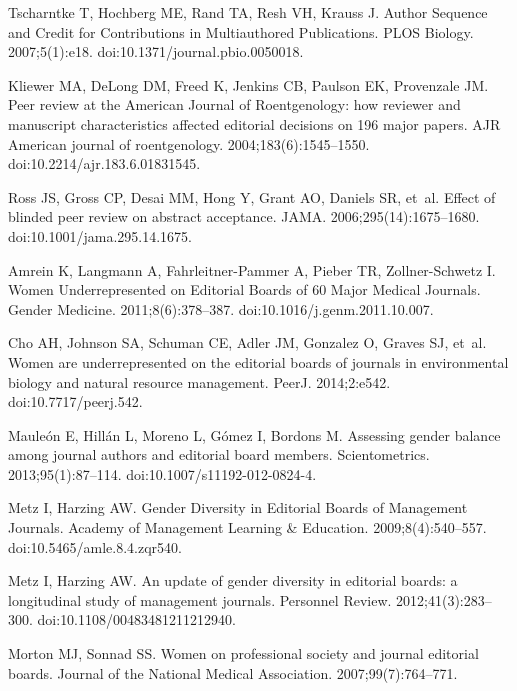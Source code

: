 \documentclass[10pt,letterpaper]{article}
\begin{document}
\begin{thebibliography}{100}
Tscharntke T, Hochberg ME, Rand TA, Resh VH, Krauss J.
\newblock Author {Sequence} and {Credit} for {Contributions} in {Multiauthored}
  {Publications}.
\newblock PLOS Biology. 2007;5(1):e18.
\newblock doi:{10.1371/journal.pbio.0050018}.

Kliewer MA, DeLong DM, Freed K, Jenkins CB, Paulson EK, Provenzale JM.
\newblock Peer review at the {American} {Journal} of {Roentgenology}: how
  reviewer and manuscript characteristics affected editorial decisions on 196
  major papers.
\newblock AJR American journal of roentgenology. 2004;183(6):1545--1550.
\newblock doi:{10.2214/ajr.183.6.01831545}.

Ross JS, Gross CP, Desai MM, Hong Y, Grant AO, Daniels SR, et~al.
\newblock Effect of blinded peer review on abstract acceptance.
\newblock JAMA. 2006;295(14):1675--1680.
\newblock doi:{10.1001/jama.295.14.1675}.

Amrein K, Langmann A, Fahrleitner-Pammer A, Pieber TR, Zollner-Schwetz I.
\newblock Women {Underrepresented} on {Editorial} {Boards} of 60 {Major}
  {Medical} {Journals}.
\newblock Gender Medicine. 2011;8(6):378--387.
\newblock doi:{10.1016/j.genm.2011.10.007}.

Cho AH, Johnson SA, Schuman CE, Adler JM, Gonzalez O, Graves SJ, et~al.
\newblock Women are underrepresented on the editorial boards of journals in
  environmental biology and natural resource management.
\newblock PeerJ. 2014;2:e542.
\newblock doi:{10.7717/peerj.542}.

Maule{\'o}n E, Hill{\'a}n L, Moreno L, G{\'o}mez I, Bordons M.
\newblock Assessing gender balance among journal authors and editorial board
  members.
\newblock Scientometrics. 2013;95(1):87--114.
\newblock doi:{10.1007/s11192-012-0824-4}.

Metz I, Harzing AW.
\newblock Gender {Diversity} in {Editorial} {Boards} of {Management}
  {Journals}.
\newblock Academy of Management Learning \& Education. 2009;8(4):540--557.
\newblock doi:{10.5465/amle.8.4.zqr540}.

Metz I, Harzing AW.
\newblock An update of gender diversity in editorial boards: a longitudinal
  study of management journals.
\newblock Personnel Review. 2012;41(3):283--300.
\newblock doi:{10.1108/00483481211212940}.

Morton MJ, Sonnad SS.
\newblock Women on professional society and journal editorial boards.
\newblock Journal of the National Medical Association. 2007;99(7):764--771.


\end{thebibliography}
\end{document}
